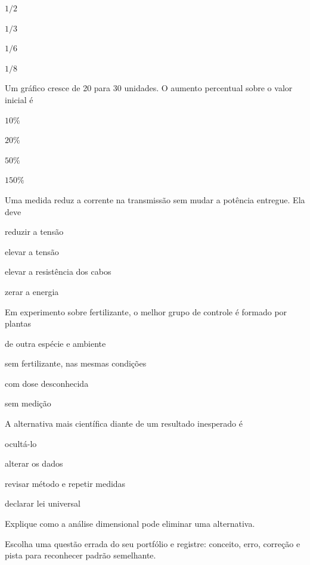 \documentclass{notaaula}
\begin{document}
\begin{exercicios}
\begin{questoes}
  \begin{alternativas}\item $1/2$\item $1/3$\item $1/6$\item $1/8$\end{alternativas}
\item Um gráfico cresce de 20 para 30 unidades. O aumento percentual sobre o valor inicial é
  \begin{alternativas}\item $10\%$\item $20\%$\item $50\%$\item $150\%$\end{alternativas}
\item Uma medida reduz a corrente na transmissão sem mudar a potência entregue. Ela deve
  \begin{alternativas}\item reduzir a tensão\item elevar a tensão\item elevar a resistência dos cabos\item zerar a energia\end{alternativas}
\item Em experimento sobre fertilizante, o melhor grupo de controle é formado por plantas
  \begin{alternativas}\item de outra espécie e ambiente\item sem fertilizante, nas mesmas condições\item com dose desconhecida\item sem medição\end{alternativas}
\item A alternativa mais científica diante de um resultado inesperado é
  \begin{alternativas}\item ocultá-lo\item alterar os dados\item revisar método e repetir medidas\item declarar lei universal\end{alternativas}
\item Explique como a análise dimensional pode eliminar uma alternativa.
\item Escolha uma questão errada do seu portfólio e registre: conceito, erro, correção e pista para reconhecer padrão semelhante.
\end{questoes}
\end{exercicios}
\end{document}
